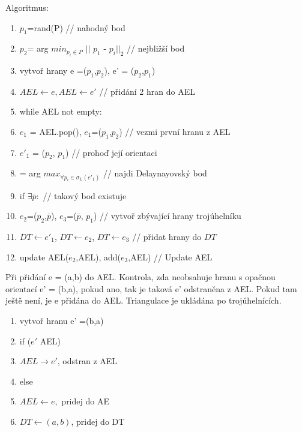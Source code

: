 \documentclass[oneside,12pt,a4paper]{book}
\begin{document}
Algoritmus$:$
\begin{enumerate}
\item $p_1$=rand(P) // nahodný bod
\item $p_2$= arg $min_{p_i \in P}$ $||$ $p_1$ - $p_i$$||_2$ // nejbližší bod
\item vytvoř hrany e =($p_1$,$p_2$), e' = ($p_2$,$p_1$)
\item $AEL \longleftarrow e, AEL \longleftarrow e'$ // přidání 2 hran do AEL
\item while AEL not empty$:$
\item \quad \quad $e_1$ = AEL.pop(), $e_1$=($p_1$,$p_2$) // vezmi první hranu z AEL
\item \quad \quad $e'_1$ = ($p_2$, $p_1$) // prohoď její orientaci
\item \quad \quad {} = arg $max_{\forall p_i \in \sigma_L (e'_1)}$  // najdi Delaynayovský bod
\item \quad \quad if $\exists \overline{p}:$ // takový bod existuje
\item \quad \quad \quad \quad $e_2$=($p_2$,$\overline{p}$), $e_3$=($\overline{p}$, $p_1$) // vytvoř zbývající hrany trojúhelníku
\item \quad \quad \quad \quad $DT \longleftarrow e'_1$, $DT \longleftarrow e_2$, $DT \longleftarrow e_3$ // přidat hrany do $DT$
\item \quad \quad \quad \quad update AEL($e_2$,AEL), add($e_3$,AEL) // Update AEL
\end{enumerate}
Při přidání e = (a,b) do AEL. Kontrola, zda neobsahuje hranu s opačnou orientací e' = (b,a), pokud ano, tak je taková e' odstraněna z AEL. Pokud tam ještě není, je e přidána do AEL. Triangulace je ukládána po trojúhelnících.\par

\begin{enumerate}
\item vytvoř hranu e' =(b,a)
\item if ($e'$ \in AEL)
\item $AEL \longrightarrow e'$, odstran z AEL
\item else

\item $AEL \longleftarrow e,$ pridej do AE
\item $DT \longleftarrow (a,b)$, pridej do DT
\end{enumerate}

\end{document}
